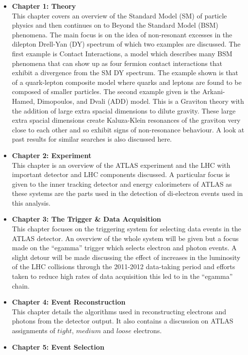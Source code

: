 \begin{itemize}
\item{ 
{\bf Chapter 1: Theory} \\
This chapter covers an overview of the Standard Model (SM) of particle physics and then continues on to Beyond the Standard Model (BSM) phenomena. The main focus is on the idea of non-resonant excesses in the dilepton Drell-Yan (DY) spectrum of which two examples are discussed. The first example is Contact Interactions, a model which describes many BSM phenomena that can show up as four fermion contact interactions that exhibit a divergence from the SM DY spectrum. The example shown is that of a quark-lepton composite model where quarks and leptons are found to be composed of smaller particles. The second example given is the Arkani-Hamed, Dimopoulos, and Dvali (ADD) model. This is a Graviton theory with the addition of large extra spacial dimensions to dilute gravity. These large extra spacial dimensions create Kaluza-Klein resonances of the graviton very close to each other and so exhibit signs of non-resonance behaviour. A look at past results for similar searches is also discussed here.
}
\item{ 
{\bf Chapter 2: Experiment} \\
This chapter is an overview of the ATLAS experiment and the LHC with important detector and LHC components discussed. A particular focus is given to the inner tracking detector and energy calorimeters of ATLAS as these systems are the parts used in the detection of di-electron events used in this analysis.
}
\item{ 
{\bf Chapter 3: The Trigger \& Data Acquisition} \\
This chapter focuses on the triggering system for selecting data events in the ATLAS detector. An overview of the whole system will be given but a focus made on the ``egamma'' trigger which selects electron and photon events. A slight detour will be made discussing the effect of increases in the luminosity of the LHC collisions through the 2011-2012 data-taking period and efforts taken to reduce high rates of data acquisition this led to in the ``egamma'' chain.
}
\item{ 
{\bf Chapter 4: Event Reconstruction} \\
This chapter details the algorithms used in reconstructing electrons and photons from the detector output. It also contains a discussion on ATLAS assignments of $tight$, $medium$ and $loose$ electrons.
}
\item{ 
{\bf Chapter 5: Event Selection} \\
}
\end{itemize}

